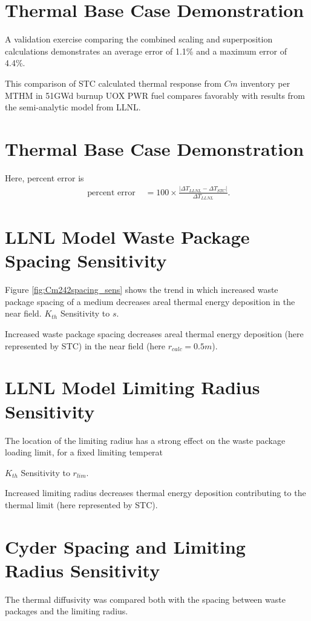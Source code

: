 \documentclass[letterpaper]{article}
\begin{document}
{  \section{Thermal Base Case Demonstration}
A validation exercise comparing the combined scaling and  
superposition calculations demonstrates an average error of 1.1\% and a 
maximum error of 4.4\%.

This comparison of STC calculated thermal response from $Cm$ 
inventory per MTHM in 51GWd burnup UOX PWR fuel compares favorably with results 
from the semi-analytic model from LLNL.


  \section{Thermal Base Case Demonstration}
Here, percent error is 
\begin{align}
\mbox{ percent error } &= 100\times\frac{\left|\Delta T_{LLNL} - \Delta 
T_{STC}\right|}{ \Delta T_{LLNL}}.
\end{align}

\section{LLNL Model Waste Package Spacing Sensitivity}
  Figure \ref{fig:Cm242spacing_sens} shows the trend in which increased waste 
  package spacing of a medium decreases areal thermal energy 
  deposition in the near field.
  $K_{th}$ Sensitivity to $s$.
  
  Increased waste package 
  spacing decreases areal thermal energy deposition 
  (here represented by STC) in the near field (here $r_{calc} = 0.5m$).


\section{LLNL Model Limiting Radius Sensitivity}
  The location of the limiting radius has a strong effect on the 
  waste package loading limit, for a fixed limiting temperat
  
  $K_{th}$ Sensitivity to $r_{lim}$.
  
  Increased limiting radius decreases thermal energy deposition contributing to 
  the thermal limit (here represented by STC).

\section{Cyder Spacing and Limiting Radius Sensitivity}
  The thermal diffusivity was compared both with the 
  spacing between waste packages and the limiting radius. 

}
\end{document}

